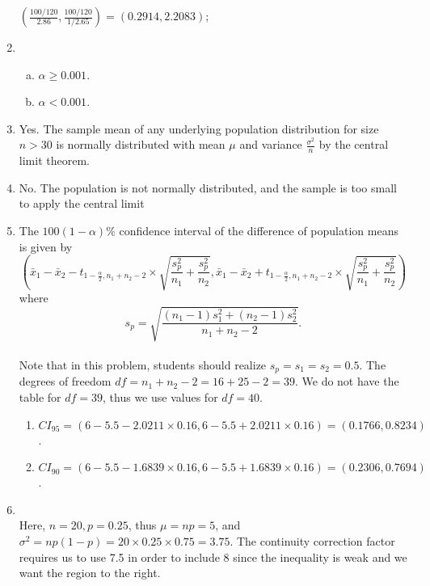 \begin{enumerate}[Q 1.]
$\left(\frac{100/120}{2.86},\frac{100/120}{1/2.65}\right)=\left(0.2914, 2.2083\right)$;\\
\item 
	\sol
	\begin{enumerate}[(a)]
	\item $\alpha \geq 0.001$.
	\item $\alpha < 0.001$.	
	\end{enumerate}
\item 
\sol Yes. The sample mean of any underlying population distribution for size $n > 30$ is normally distributed with mean $\mu$ and variance $\frac{\sigma^2}{n}$ by the central limit theorem.
\item 
\sol No. The population is not normally distributed, and the sample is too small to apply the central limit 
\item 
\sol The $100(1-\alpha)\%$ confidence interval of the difference of population means is given by $$\left(\bar{x}_1 - \bar{x}_2 - t_{1 - \frac{\alpha}{2},n_1 + n_2 - 2} \times \sqrt{\frac{s_p^2}{n_1} + \frac{s_p^2}{n_2}},\bar{x}_1 - \bar{x}_2 + t_{1 - \frac{\alpha}{2},n_1 + n_2 - 2} \times \sqrt{\frac{s_p^2}{n_1} + \frac{s_p^2}{n_2}}\right)$$ where $$s_p = \sqrt{\frac{(n_1 - 1)s_1^2+(n_2 - 1)s_2^2}{n_1 + n_2 - 2}}.$$\\
Note that in this problem, students should realize $s_p = s_1 = s_2 = 0.5$.
The degrees of freedom $ df= n_1+n_2-2=16+25-2=39$. We do not have the table for $df=39$, thus we use values for $df=40$. 
	\begin{enumerate}
	\item $CI_{95} = (6 - 5.5 - 2.0211 \times 0.16, 6 - 5.5 + 2.0211 \times 0.16) = (0.1766,0.8234)$.
	\item $CI_{90} = (6 - 5.5 - 1.6839 \times 0.16, 6 - 5.5 + 1.6839 \times 0.16) = (0.2306,0.7694)$.
	\end{enumerate}
\item 
\sol\\
Here, $n=20, p=0.25$, thus $\mu=np=5$, and $\sigma^2=np(1-p)=20\times 0.25 \times 0.75=3.75.$
The continuity correction factor requires us to use 7.5 in order to include 8 since the inequality is weak and we want the region to the right.
\begin{align*}

\end{align*}
\end{enumerate}
